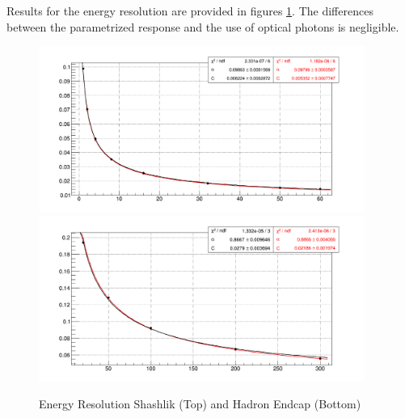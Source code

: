  Results for the energy resolution are provided in figures \ref{fig:simulations_shashlikhe_resolution}. The differences between the parametrized response and the use of optical photons is negligible.
 \begin{figure}[htbp]
    \centering
    \includegraphics[width=0.95\textwidth]{figures/ch_simulations/shashlik/performance/energyResolution.png}\\
    \includegraphics[width=0.95\textwidth]{figures/ch_simulations/he/performance/Resolution.png}
    \caption{Energy Resolution Shashlik (Top) and Hadron Endcap (Bottom)}
    \label{fig:simulations_shashlikhe_resolution}
 \end{figure}
